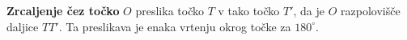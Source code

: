                 
        

        
        ~\\~\\~~\\~\\

            
                \textbf{Zrcaljenje čez točko} $O$ preslika točko $T$ v tako točko $T'$, da je $O$ razpolovišče daljice $TT'$. Ta preslikava je enaka vrtenju okrog točke za $180^\circ$.


